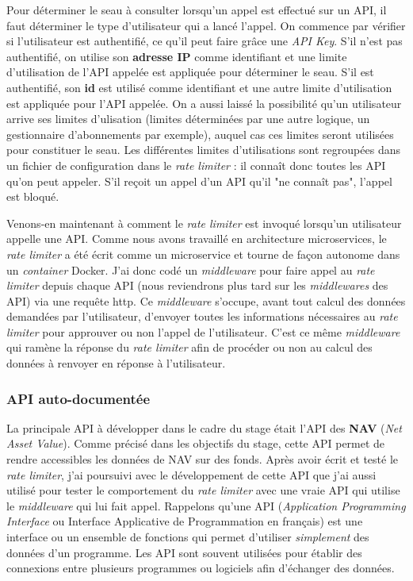 Pour déterminer le seau à consulter lorsqu'un appel est effectué sur un API, il faut déterminer le type d'utilisateur qui a lancé l'appel. On commence par vérifier si l'utilisateur est authentifié, ce qu'il peut faire grâce une \textit{API Key}. S'il n'est pas authentifié, on utilise son \textbf{adresse IP} comme identifiant et une limite d'utilisation de l'API appelée est appliquée pour déterminer le seau. S'il est authentifié, son \textbf{id} est utilisé comme identifiant et une autre limite d'utilisation est appliquée pour l'API appelée. On a aussi laissé la possibilité qu'un utilisateur arrive ses limites d'ulisation (limites déterminées par une autre logique, un gestionnaire d'abonnements par exemple), auquel cas ces limites seront utilisées pour constituer le seau. Les différentes limites d'utilisations sont regroupées dans un fichier de configuration dans le \textit{rate limiter} : il connaît donc toutes les API qu'on peut appeler. S'il reçoit un appel d'un API qu'il "ne connaît pas", l'appel est bloqué.

\vspace{3mm}

Venons-en maintenant à comment le \textit{rate limiter} est invoqué lorsqu'un utilisateur appelle une API. Comme nous avons travaillé en architecture microservices, le \textit{rate limiter} a été écrit comme un microservice et tourne de façon autonome dans un \textit{container} Docker. J'ai donc codé un \textit{middleware} pour faire appel au \textit{rate limiter} depuis chaque API (nous reviendrons plus tard sur les \textit{middlewares} des API) via une requête http. Ce \textit{middleware} s'occupe, avant tout calcul des données demandées par l'utilisateur, d'envoyer toutes les informations nécessaires au \textit{rate limiter} pour approuver ou non l'appel de l'utilisateur. C'est ce même \textit{middleware} qui ramène la réponse du \textit{rate limiter} afin de procéder ou non au calcul des données à renvoyer en réponse à l'utilisateur.



\subsubsection{API auto-documentée}
La principale API à développer dans le cadre du stage était l'API des \textbf{NAV} (\textit{Net Asset Value}). Comme précisé dans les objectifs du stage, cette API permet de rendre accessibles les données de NAV sur des fonds. Après avoir écrit et testé le \textit{rate limiter}, j'ai poursuivi avec le développement de cette API que j'ai aussi utilisé pour tester le comportement du \textit{rate limiter} avec une vraie API qui utilise le \textit{middleware} qui lui fait appel. Rappelons qu'une API (\textit{Application Programming Interface} ou Interface Applicative de Programmation en français) est une interface ou un ensemble de fonctions qui permet d'utiliser \emph{simplement} des données d'un programme. Les API sont souvent utilisées pour établir des connexions entre plusieurs programmes ou logiciels afin d'échanger des données.

